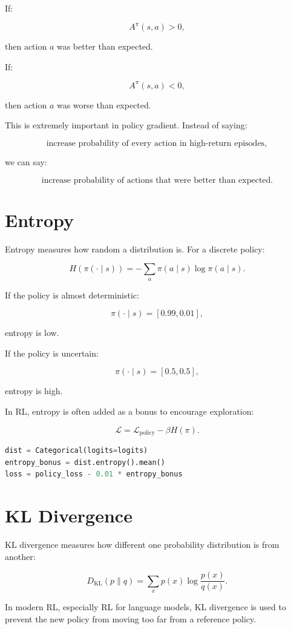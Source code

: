 \documentclass[11pt]{article}
\begin{document}
If:

\[
A^\pi(s,a) > 0,
\]

then action $a$ was better than expected.

If:

\[
A^\pi(s,a) < 0,
\]

then action $a$ was worse than expected.

This is extremely important in policy gradient.
Instead of saying:

\[
\text{increase probability of every action in high-return episodes},
\]

we can say:

\[
\text{increase probability of actions that were better than expected}.
\]

\section{Entropy}

Entropy measures how random a distribution is.
For a discrete policy:

\[
H(\pi(\cdot \mid s))
=
-\sum_a \pi(a \mid s)\log \pi(a \mid s).
\]

If the policy is almost deterministic:

\[
\pi(\cdot \mid s) = [0.99, 0.01],
\]

entropy is low.

If the policy is uncertain:

\[
\pi(\cdot \mid s) = [0.5, 0.5],
\]

entropy is high.

In RL, entropy is often added as a bonus to encourage exploration:

\[
\mathcal{L}
=
\mathcal{L}_{\text{policy}} - \beta H(\pi).
\]

\begin{lstlisting}[language=Python]
dist = Categorical(logits=logits)
entropy_bonus = dist.entropy().mean()
loss = policy_loss - 0.01 * entropy_bonus
\end{lstlisting}

\section{KL Divergence}

KL divergence measures how different one probability distribution is from another:

\[
D_{\mathrm{KL}}(p \| q)
=
\sum_x p(x)\log \frac{p(x)}{q(x)}.
\]

In modern RL, especially RL for language models, KL divergence is used to prevent the new policy from moving too far from a reference policy.
\end{document}
